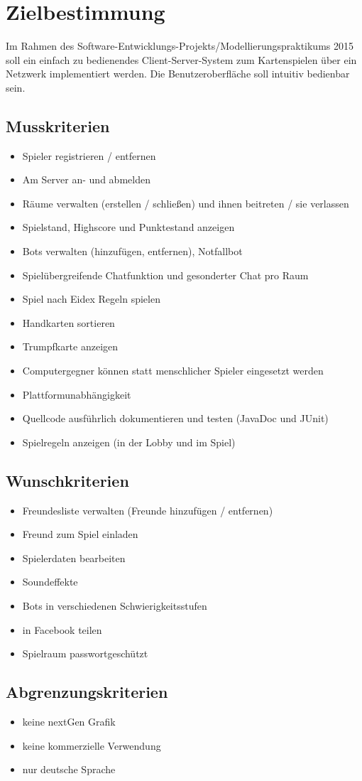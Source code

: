 \chapter{Zielbestimmung}

	Im Rahmen des Software-Entwicklungs-Projekts/Modellierungspraktikums 2015 soll ein einfach zu bedienendes Client-Server-System zum Kartenspielen über ein Netzwerk implementiert werden. Die Benutzeroberfläche soll intuitiv bedienbar sein.


	\section{Musskriterien}

		\begin{itemize}
			\item Spieler registrieren / entfernen
			\item Am Server an- und abmelden
			\item Räume verwalten (erstellen / schließen) und ihnen beitreten / sie verlassen
			\item Spielstand, Highscore und Punktestand anzeigen
			\item Bots verwalten (hinzufügen, entfernen), Notfallbot
			\item Spielübergreifende Chatfunktion und gesonderter Chat pro Raum
			\item Spiel nach Eidex Regeln spielen
			\item Handkarten sortieren
			\item Trumpfkarte anzeigen
			\item Computergegner können statt menschlicher Spieler eingesetzt werden
			\item Plattformunabhängigkeit
			\item Quellcode ausführlich dokumentieren und testen (JavaDoc und JUnit)
			\item Spielregeln anzeigen (in der Lobby und im Spiel)
		\end{itemize}


	\section{Wunschkriterien}

		\begin{itemize}
			\item Freundesliste verwalten (Freunde hinzufügen / entfernen)
			\item Freund zum Spiel einladen
			\item Spielerdaten bearbeiten
			\item Soundeffekte
			\item Bots in verschiedenen Schwierigkeitsstufen
			\item in Facebook teilen
			\item Spielraum passwortgeschützt
		\end{itemize}

 	\section{Abgrenzungskriterien} %

 		\begin{itemize}
 			\item keine nextGen Grafik
 			\item keine kommerzielle Verwendung
 			\item nur deutsche Sprache

		\end{itemize}
